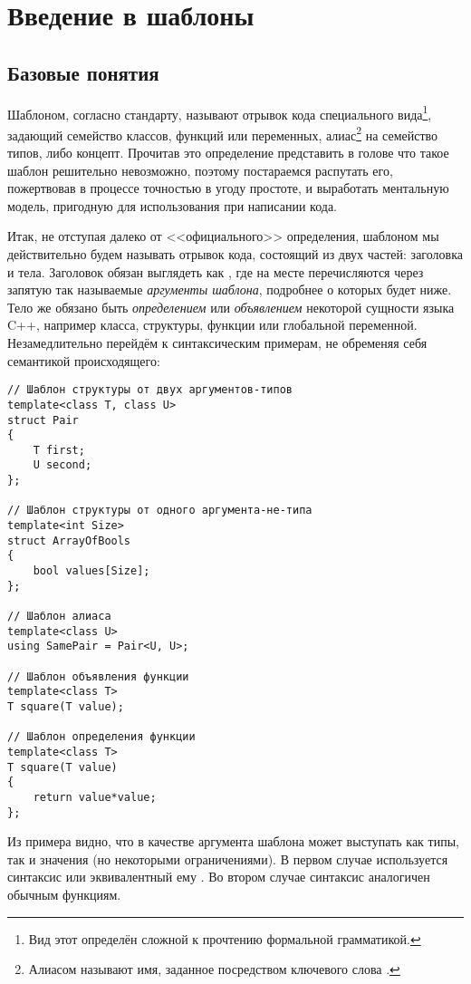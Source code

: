\chapter{Введение в шаблоны}
\section{Базовые понятия}
Шаблоном, согласно стандарту, называют отрывок кода специального вида\footnote{Вид этот определён сложной к прочтению формальной грамматикой.}, задающий семейство классов, функций или переменных, алиас\footnote{Алиасом называют имя, заданное посредством ключевого слова .} на семейство типов, либо концепт. Прочитав это определение представить в голове что такое шаблон решительно невозможно, поэтому постараемся распутать его, пожертвовав в процессе точностью в угоду простоте, и выработать ментальную модель, пригодную для использования при написании кода.

Итак, не отступая далеко от <<официального>> определения, шаблоном мы действительно будем называть отрывок кода, состоящий из двух частей: заголовка и тела. Заголовок обязан выглядеть как , где на месте  перечисляются через запятую так называемые \textit{аргументы шаблона}, подробнее о которых будет ниже. Тело же обязано быть \textit{определением} или \textit{объявлением} некоторой сущности языка C++, например класса, структуры, функции или глобальной переменной. Незамедлительно перейдём к синтаксическим примерам, не обременяя себя семантикой происходящего:
\begin{verbatim}
// Шаблон структуры от двух аргументов-типов
template<class T, class U>
struct Pair
{
    T first;
    U second;
};

// Шаблон структуры от одного аргумента-не-типа
template<int Size>
struct ArrayOfBools
{
    bool values[Size];
};

// Шаблон алиаса
template<class U>
using SamePair = Pair<U, U>;

// Шаблон объявления функции
template<class T>
T square(T value);

// Шаблон определения функции
template<class T>
T square(T value)
{
    return value*value;
};
\end{verbatim}
Из примера видно, что в качестве аргумента шаблона может выступать как типы, так и значения (но некоторыми ограничениями). В первом случае используется синтаксис  или эквивалентный ему . Во втором случае синтаксис аналогичен обычным функциям.

